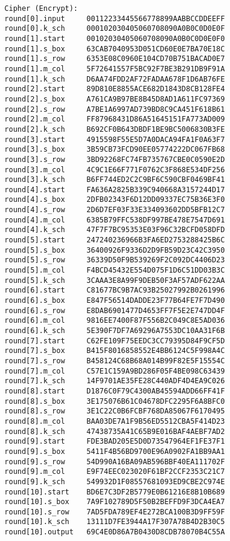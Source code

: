 \begin{verbatim}
  Cipher (Encrypt): 
  round[0].input     00112233445566778899AABBCCDDEEFF 
  round[0].k_sch     000102030405060708090A0B0C0D0E0F 
  round[1].start     00102030405060708090A0B0C0D0E0F0 
  round[1].s_box     63CAB7040953D051CD60E0E7BA70E18C 
  round[1].s_row     6353E08C0960E104CD70B751BACAD0E7 
  round[1].m_col     5F72641557F5BC92F7BE3B291DB9F91A 
  round[1].k_sch     D6AA74FDD2AF72FADAA678F1D6AB76FE 
  round[2].start     89D810E8855ACE682D1843D8CB128FE4 
  round[2].s_box     A761CA9B97BE8B45D8AD1A611FC97369 
  round[2].s_row     A7BE1A6997AD739BD8C9CA451F618B61 
  round[2].m_col     FF87968431D86A51645151FA773AD009 
  round[2].k_sch     B692CF0B643DBDF1BE9BC5006830B3FE 
  round[3].start     4915598F55E5D7A0DACA94FA1F0A63F7 
  round[3].s_box     3B59CB73FCD90EE05774222DC067FB68 
  round[3].s_row     3BD92268FC74FB735767CBE0C0590E2D 
  round[3].m_col     4C9C1E66F771F0762C3F868E534DF256 
  round[3].k_sch     B6FF744ED2C2C9BF6C590CBF0469BF41 
  round[4].start     FA636A2825B339C940668A3157244D17 
  round[4].s_box     2DFB02343F6D12DD09337EC75B36E3F0 
  round[4].s_row     2D6D7EF03F33E334093602DD5BFB12C7 
  round[4].m_col     6385B79FFC538DF997BE478E7547D691 
  round[4].k_sch     47F7F7BC95353E03F96C32BCFD058DFD 
  round[5].start     247240236966B3FA6ED2753288425B6C 
  round[5].s_box     36400926F9336D2D9FB59D23C42C3950 
  round[5].s_row     36339D50F9B539269F2C092DC4406D23 
  round[5].m_col     F4BCD45432E554D075F1D6C51DD03B3C 
  round[5].k_sch     3CAAA3E8A99F9DEB50F3AF57ADF622AA 
  round[6].start     C81677BC9B7AC93B25027992B0261996 
  round[6].s_box     E847F56514DADDE23F77B64FE7F7D490 
  round[6].s_row     E8DAB6901477D4653FF7F5E2E747DD4F 
  round[6].m_col     9816EE7400F87F556B2C049C8E5AD036 
  round[6].k_sch     5E390F7DF7A69296A7553DC10AA31F6B 
  round[7].start     C62FE109F75EEDC3CC79395D84F9CF5D 
  round[7].s_box     B415F8016858552E4BB6124C5F998A4C 
  round[7].s_row     B458124C68B68A014B99F82E5F15554C 
  round[7].m_col     C57E1C159A9BD286F05F4BE098C63439 
  round[7].k_sch     14F9701AE35FE28C440ADF4D4EA9C026 
  round[8].start     D1876C0F79C4300AB45594ADD66FF41F 
  round[8].s_box     3E175076B61C04678DFC2295F6A8BFC0 
  round[8].s_row     3E1C22C0B6FCBF768DA85067F6170495 
  round[8].m_col     BAA03DE7A1F9B56ED5512CBA5F414D23 
  round[8].k_sch     47438735A41C65B9E016BAF4AEBF7AD2 
  round[9].start     FDE3BAD205E5D0D73547964EF1FE37F1 
  round[9].s_box     5411F4B56BD9700E96A0902FA1BB9AA1 
  round[9].s_row     54D990A16BA09AB596BBF40EA111702F 
  round[9].m_col     E9F74EEC023020F61BF2CCF2353C21C7 
  round[9].k_sch     549932D1F08557681093ED9CBE2C974E 
  round[10].start    BD6E7C3DF2B5779E0B61216E8B10B689 
  round[10].s_box    7A9F102789D5F50B2BEFFD9F3DCA4EA7 
  round[10].s_row    7AD5FDA789EF4E272BCA100B3D9FF59F 
  round[10].k_sch    13111D7FE3944A17F307A78B4D2B30C5 
  round[10].output   69C4E0D86A7B0430D8CDB78070B4C55A
\end{verbatim}

